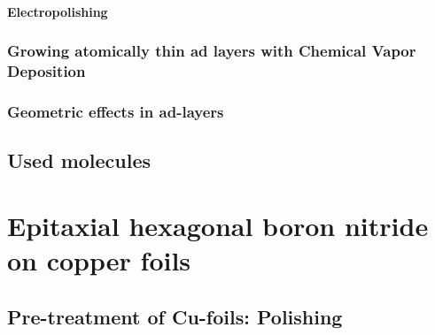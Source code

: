 \documentclass[
10pt,					%
a4paper,				%
twoside,				%
BCOR=8mm,				%
headings=normal,		%
headsepline,			%
footsepline,			%
plainfootsepline,		%
]{scrbook}
\begin{document}
     \subsubsection{Electropolishing}
    	
     \subsection{Growing atomically thin ad layers with \textbf{C}hemical \textbf{V}apor \textbf{D}eposition}
             
     \subsection{Geometric effects in ad-layers}
		
  \section{Used molecules}
    
%
%
\chapter{Epitaxial hexagonal boron nitride on copper foils}
  
\section{Pre-treatment of Cu-foils: Polishing}
  	
\end{document}
